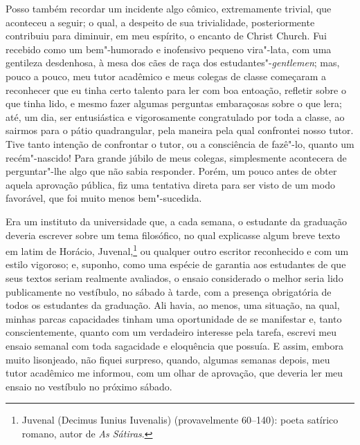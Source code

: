 Posso também recordar um incidente algo cômico, extremamente
trivial, que aconteceu a seguir; o qual, a despeito de sua trivialidade,
posteriormente contribuiu para diminuir, em meu espírito, o encanto de
Christ Church. Fui recebido como um bem"-humorado e inofensivo pequeno
vira"-lata, com uma gentileza desdenhosa, à mesa dos cães de raça dos
estudantes"-\textit{gentlemen}; mas, pouco a pouco, meu tutor acadêmico e
meus colegas de classe começaram a reconhecer que eu tinha certo talento
para ler com boa entoação, refletir sobre o que tinha lido, e mesmo
fazer algumas perguntas embaraçosas sobre o que lera; até, um dia, ser
entusiástica e vigorosamente congratulado por toda a classe, ao sairmos
para o pátio quadrangular, pela maneira pela qual confrontei nosso
tutor. Tive tanto intenção de confrontar o tutor, ou a consciência de
fazê"-lo, quanto um recém"-nascido! Para grande júbilo de meus colegas,
simplesmente acontecera de perguntar"-lhe algo que não sabia responder.
Porém, um pouco antes de obter aquela aprovação pública, fiz uma
tentativa direta para ser visto de um modo favorável, que foi muito
menos bem"-sucedida.

Era um instituto da universidade que, a cada semana, o estudante da
graduação deveria escrever sobre um tema filosófico, no qual explicasse
algum breve texto em latim de Horácio, Juvenal,\footnote{Juvenal (Decimus
  Iunius Iuvenalis) (provavelmente 60--140): poeta satírico romano, autor
  de \textit{As Sátiras}.} ou qualquer outro escritor
reconhecido e com um estilo vigoroso; e, suponho, como uma espécie de
garantia aos estudantes de que seus textos seriam realmente avaliados, o
ensaio considerado o melhor seria lido publicamente no vestíbulo, no
sábado à tarde, com a presença obrigatória de todos os estudantes da
graduação. Ali havia, ao menos, uma situação, na qual, minhas parcas
capacidades tinham uma oportunidade de se manifestar e, tanto
conscientemente, quanto com um verdadeiro interesse pela tarefa, escrevi
meu ensaio semanal com toda sagacidade e eloquência que possuía. E
assim, embora muito lisonjeado, não fiquei surpreso, quando, algumas
semanas depois, meu tutor acadêmico me informou, com um olhar de
aprovação, que deveria ler meu ensaio no vestíbulo no próximo sábado.


